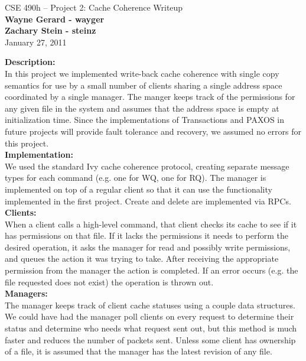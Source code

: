 \documentclass[11pt]{article}
\begin{document}
\begin{center}
{\large CSE 490h -- Project 2: Cache Coherence Writeup} \\
\textbf{Wayne Gerard - wayger} \\
\textbf{Zachary Stein - steinz} \\
January 27, 2011
\end{center}

\textbf{Description:} \\

In this project we implemented write-back cache coherence with single copy semantics for use by a small number of clients sharing a single address space coordinated by a single manager. 
The manger keeps track of the permissions for any given file in the system and assumes that the address space is empty at initialization time.
Since the implementations of Transactions and PAXOS in future projects will provide fault tolerance and recovery, we assumed no errors for this project. \\

\textbf{Implementation:} \\

We used the standard Ivy cache coherence protocol, creating separate message types for each command (e.g. one for WQ, one for RQ).
The manager is implemented on top of a regular client so that it can use the functionality implemented in the first project. Create and delete are implemented via RPCs. \\

\textbf{Clients:} \\

When a client calls a high-level command, that client checks its cache to see if it has permissions on that file. If it lacks the permissions it needs to perform the desired operation, it asks the 
manager for read and possibly write permissions, and queues the action it was trying to take. After receiving the appropriate 
permission from the manager the action is completed. If an error occurs (e.g. the file requested does not exist) the operation is thrown out. \\

\textbf{Managers:} \\ 

The manager keeps track of client cache statuses using a couple data structures. We could have had the manager poll clients on every request to 
determine their status and determine who needs what request sent out, but this method is much faster and reduces the number of packets sent. Unless some
client has ownership of a file, it is assumed that the manager has the latest revision of any file.\\
\end{document}
